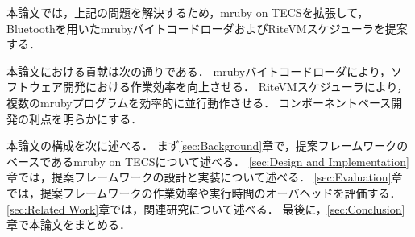 \documentclass[submit,techrep]{ipsj}
\begin{document}
本論文では，上記の問題を解決するため，mruby on TECSを拡張して，Bluetoothを用いたmrubyバイトコードローダおよびRiteVMスケジューラを提案する．

本論文における貢献は次の通りである．
mrubyバイトコードローダにより，ソフトウェア開発における作業効率を向上させる．
RiteVMスケジューラにより，複数のmrubyプログラムを効率的に並行動作させる．
コンポーネントベース開発の利点を明らかにする．

本論文の構成を次に述べる．
まず\ref{sec:Background}章で，提案フレームワークのベースであるmruby on TECSについて述べる．
\ref{sec:Design and Implementation}章では，提案フレームワークの設計と実装について述べる．
\ref{sec:Evaluation}章では，提案フレームワークの作業効率や実行時間のオーバヘッドを評価する．
\ref{sec:Related Work}章では，関連研究について述べる．
最後に，\ref{sec:Conclusion}章で本論文をまとめる．
\end{document}
